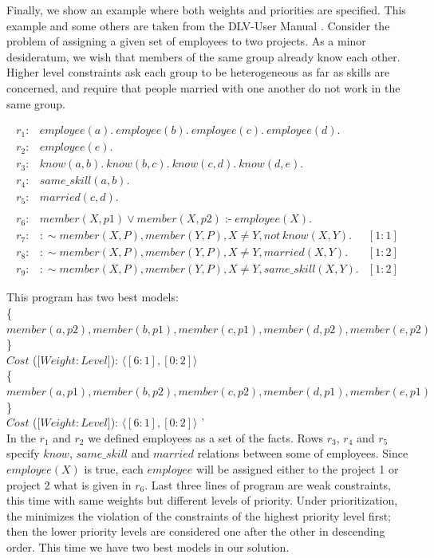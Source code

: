 \documentclass[14pt,a4paper, titlepage]{article}
\DeclareMathOperator{\leftimpl}{:-}
\begin{document}
Finally, we show an example where both weights and 
priorities are specified. This example and some others are 
taken from the DLV-User Manual \cite{dlvum}. Consider the 
problem of assigning a given set of employees to two 
projects. As a minor desideratum, we wish that members of 
the same group already know each other. Higher level 
constraints ask each group to be heterogeneous as far as 
skills are concerned, and require that people married with 
one another do not work in the same group.
\begin{exmp}
\begin{align*}
r_1\colon& \mathit{employee}(a). \ \mathit{employee}(b). \ 
\mathit{employee}(c). \ \mathit{employee(d)}. \ \\
r_2\colon& \mathit{employee}(e). \\
r_3\colon& \mathit{know}(a,b). \ \mathit{know}(b,c). \ 
\mathit{know}(c,d). \ \mathit{know}(d,e). \ \\
r_4\colon& \mathit{same\_skill}(a,b). \\
r_5\colon& \mathit{married(c,d)}. \\
\\ 
r_6\colon& \mathit{member}(X,p1) \vee \mathit{member}(X,p2) 
\leftimpl \mathit{employee}(X).\\
r_7\colon& : \sim \mathit{member}(X,P), \mathit{member}
(Y,P), X \neq Y, \mathit{not} \ \mathit{know(X,Y)}.& 
[1:1] \\
r_{8}\colon& : \sim  \mathit{member}(X,P), \mathit{member}
(Y,P), X \neq Y, \mathit{marrie}d(X,Y). & [1:2]\\
r_{9}\colon& : \sim member(X,P), member(Y,P), X \neq Y, 
same\_skill(X,Y). & [1:2] 
\end{align*}
\end{exmp}
This program has two best models:
\\ \{$\mathit{member}(a,p2), \mathit{member}(b,p1), 
\mathit{member}(c,p1), \mathit{member}(d,p2), 
\mathit{member}(e,p2)$\}
\\$\mathit{Cost}$ ($[ \mathit{Weight:Level]}$): $ \langle 
[6:1],[0:2] \rangle $
\\ \{$\mathit{member}(a,p1), \mathit{member}(b,p2), 
\mathit{member}(c,p2), \mathit{member}(d,p1), 
\mathit{member}(e,p1)$\}
\\$\mathit{Cost}$ ($[ \mathit{Weight:Level]}$): $ \langle 
[6:1],[0:2] \rangle $ '\\


In the $r_1$ and $r_2$ we defined employees as a set of the 
facts. Rows $r_3$, $r_4$ and $r_5$ specify $\mathit{know}$, 
$\mathit{same\_skill}$ and $\mathit{married}$ relations 
between some of employees. Since $\mathit{employee}(X)$ is 
true, each $\mathit{employee}$ will be assigned either to 
the project 1 or project 2 what is given in $r_6$. Last 
three lines of program are weak constraints, this time with 
same weights but different levels of priority. Under 
prioritization, the \dlvhex{} minimizes the violation of 
the constraints of the highest priority level first; then 
the lower priority levels are considered one after the 
other in descending order. This time we have two best 
models in our solution.     
\end{document}
